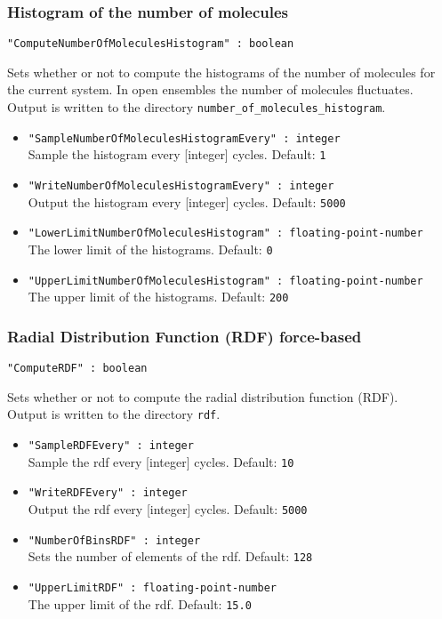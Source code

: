 \subsubsection{Histogram of the number of molecules}
\begin{framed}
\verb+"ComputeNumberOfMoleculesHistogram" : boolean+
\end{framed}
Sets whether or not to compute the histograms of the number of molecules for the current system.
In open ensembles the number of molecules fluctuates.\\
Output is written to the directory \verb+number_of_molecules_histogram+.
\begin{itemize}
\item{\verb+"SampleNumberOfMoleculesHistogramEvery" : integer+}\\
Sample the histogram every [integer] cycles. Default: \verb+1+
\item{\verb+"WriteNumberOfMoleculesHistogramEvery" : integer+}\\
Output the histogram every [integer] cycles. Default: \verb+5000+
\item{\verb+"LowerLimitNumberOfMoleculesHistogram" : floating-point-number+}\\
The lower limit of the histograms. Default: \verb+0+
\item{\verb+"UpperLimitNumberOfMoleculesHistogram" : floating-point-number+}\\
The upper limit of the histograms. Default: \verb+200+
\end{itemize}

\subsubsection{Radial Distribution Function (RDF) force-based}
\begin{framed}
\verb+"ComputeRDF" : boolean+
\end{framed}
Sets whether or not to compute the radial distribution function (RDF).\\
Output is written to the directory \verb+rdf+.
\begin{itemize}
\item{\verb+"SampleRDFEvery" : integer+}\\
Sample the rdf every [integer] cycles. Default: \verb+10+
\item{\verb+"WriteRDFEvery" : integer+}\\
Output the rdf every [integer] cycles. Default: \verb+5000+
\item{\verb+"NumberOfBinsRDF" : integer+}\\
Sets the number of elements of the rdf. Default: \verb+128+
\item{\verb+"UpperLimitRDF" : floating-point-number+}\\
The upper limit of the rdf. Default: \verb+15.0+
\end{itemize}


